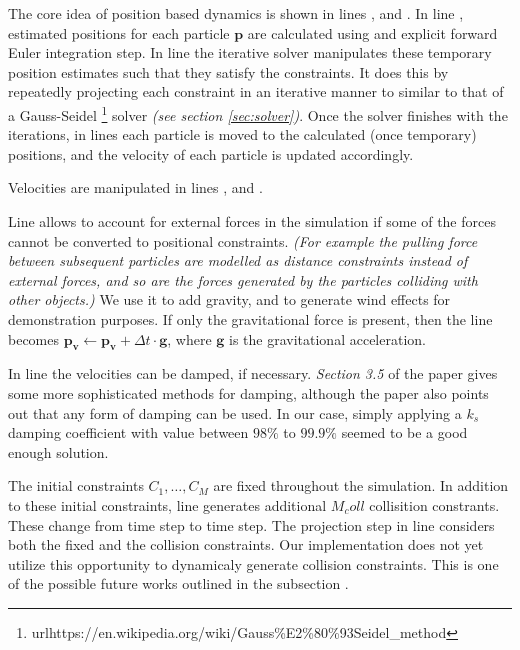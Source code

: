 \documentclass[sigplan,screen,nonacm]{acmart}
\renewcommand{\b}{\boldsymbol}
\begin{document}
The core idea of position based dynamics is shown in lines ,
 and . In line , estimated
positions for each particle $\b{p}$ are calculated using and explicit forward
Euler integration step. In line  the iterative solver manipulates
these temporary position estimates such that they satisfy the constraints. It
does this by repeatedly projecting each constraint in an iterative manner to
similar to that of a Gauss-Seidel
\footnote{url{https://en.wikipedia.org/wiki/Gauss\%E2\%80\%93Seidel\_method}}
solver \emph{(see section \ref{sec:solver})}. Once the solver finishes with the
iterations, in lines  each particle is moved to the calculated
(once temporary) positions, and the velocity of each particle is updated
accordingly.

Velocities are manipulated in lines ,  and
. 

Line  allows to account for external forces
in the simulation if some of the forces cannot be converted to positional
constraints. \emph{(For example the pulling force between subsequent particles
are modelled as distance constraints instead of external forces, and so are the
forces generated by the particles colliding with other objects.)} We use it to
add gravity, and to generate wind effects for demonstration purposes. If only
the gravitational force is present, then the line becomes $\b{p_v} \gets \b{p_v}
+ \Delta t \cdot \b{g}$, where $\b{g}$ is the gravitational acceleration.

In line  the velocities can be damped, if necessary. \emph{Section
3.5} of the \citet{MullerPBD} paper gives some more sophisticated methods for
damping, although the paper also points out that any form of damping can be
used. In our case, simply applying a $k_s$ damping coefficient with value
between $98\%$ to $99.9\%$ seemed to be a good enough solution.

The initial constraints $C_1, \ldots, C_M$ are fixed throughout the simulation.
In addition to these initial constraints, line  generates additional
$M_coll$ collisition constrants. These change from time step to time step. The
projection step in line  considers both the fixed and the
collision constraints. Our implementation does not yet utilize this opportunity
to dynamicaly generate collision constraints. This is one of the possible future
works outlined in the subsection .
\end{document}
